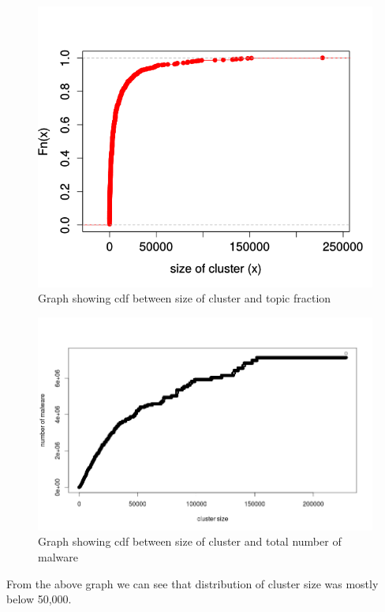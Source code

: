 \begin{figure}
\begin{center}
  \includegraphics[scale=0.3]{figures/ecdfclustersize.png}
\end{center}
\caption{Graph showing cdf between size of cluster and topic fraction}
\label{fig:ecdfclustersize}
\end{figure}
\begin{figure}
\begin{center}
  \includegraphics[scale=0.3]{figures/cdfclusterlen2.png}
\end{center}
\caption{Graph showing cdf between size of cluster and total number of malware}
\label{fig:cdfclusterlen}
\end{figure}
From the above graph we can see that distribution of cluster size was mostly below 50,000.
